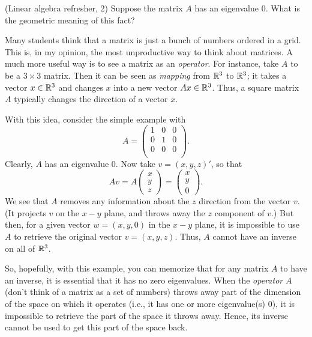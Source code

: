 \begin{exercise}(Linear algebra refresher, 2) Suppose the matrix $A$
  has an eigenvalue $0$. What is the geometric meaning of this fact? 
  \begin{solution}
    Many students think that a matrix is just a bunch of numbers
    ordered in a grid. This is, in my opinion, the most unproductive
    way to think about matrices. A much more useful way is to see a
    matrix as an \emph{operator}. For instance, take $A$ to be a
    $3\times3$ matrix. Then it can be seen as \emph{mapping} from
    $\mathbb{R}^3$ to $\mathbb{R}^3$; it takes a vector $x\in\mathbb{R}^3$ and changes $x$
    into a new vector $Ax\in \mathbb{R}^3$. Thus, a square matrix $A$ typically changes the
 direction of a vector $x$. 

With this idea, consider the simple example with
    \begin{equation*}
A =
    \begin{pmatrix}
      1 & 0 & 0 \\ 
      0 & 1 & 0 \\ 
      0 & 0 & 0 \\ 
    \end{pmatrix}.
  \end{equation*}
Clearly, $A$ has an eigenvalue $0$. Now take $v=(x,y,z)'$, so that
    \begin{equation*}
A v = A
 \begin{pmatrix}
x\\
y\\
z
    \end{pmatrix}
= \begin{pmatrix}
x\\
y\\
0
    \end{pmatrix}.
  \end{equation*}
  We see that $A$ removes any information about the $z$ direction from
  the vector $v$. (It projects $v$ on the $x-y$ plane, and throws away
  the $z$ component of $v$.) But then, for a given vector $w=(x,y,0)$
  in the $x-y$ plane, it is impossible to use $A$ to retrieve the
  original vector $v=(x,y,z)$. Thus, $A$ cannot have an inverse on all
  of $\mathbb{R}^3$.

  So, hopefully, with this example, you can memorize that for any
  matrix $A$ to have an inverse, it is essential that it has no zero
  eigenvalues. When the \emph{operator} $A$ (don't think of a matrix
  as a set of numbers) throws away part of the dimension of the space
  on which it operates (i.e., it has one or more eigenvalue(s) $0$), it is impossible to retrieve the part of the space it throws away. Hence, its inverse cannot be used to get this part of the space back. 

\end{solution}


\end{exercise}



